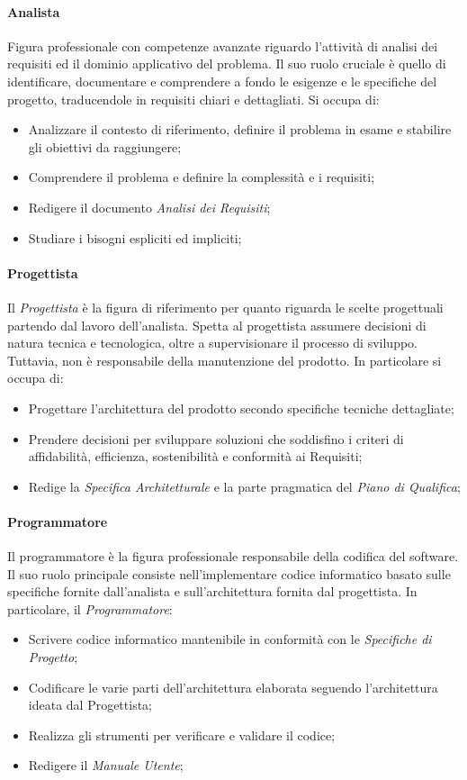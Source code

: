 \documentclass{article}
\begin{document}
\paragraph{Analista}\label{analista}Figura professionale con competenze avanzate riguardo l'attività di analisi dei requisiti ed il dominio applicativo del problema. Il suo ruolo cruciale è quello di identificare, documentare e comprendere a fondo le esigenze e le specifiche del progetto, traducendole in requisiti chiari e dettagliati. Si occupa di:
\begin{itemize}
    \item Analizzare il contesto di riferimento, definire il problema in esame e stabilire gli obiettivi da raggiungere;
    \item Comprendere il problema e definire la complessità e i requisiti;
    \item Redigere il documento \textit{Analisi dei Requisiti};
    \item Studiare i bisogni espliciti ed impliciti;
\end{itemize}
\paragraph{Progettista}\label{progettista}Il \textit{Progettista} è la figura di riferimento per quanto riguarda le scelte progettuali partendo dal lavoro dell'analista. Spetta al progettista assumere decisioni di natura tecnica e tecnologica, oltre a supervisionare il processo di sviluppo. Tuttavia, non è responsabile della manutenzione del prodotto. In particolare si occupa di:
\begin{itemize}
    \item Progettare l'architettura del prodotto secondo specifiche tecniche dettagliate;
    \item Prendere decisioni per sviluppare soluzioni che soddisfino i criteri di affidabilità, efficienza, sostenibilità e conformità ai Requisiti;
    \item Redige la \textit{Specifica Architetturale} e la parte pragmatica del \textit{Piano di Qualifica};
\end{itemize}
\paragraph{Programmatore}\label{programmatore}Il programmatore è la figura professionale responsabile della codifica del software. Il suo ruolo principale consiste nell'implementare codice informatico basato sulle specifiche fornite dall'analista e sull'architettura fornita dal progettista. In particolare, il \textit{Programmatore}:
\begin{itemize}
    \item Scrivere codice informatico mantenibile in conformità con le \textit{Specifiche di Progetto};
    \item Codificare le varie parti dell'architettura elaborata seguendo l'architettura ideata dal Progettista;
    \item Realizza gli strumenti per verificare e validare il codice;
    \item Redigere il \textit{Manuale Utente};
\end{itemize}
\end{document}
